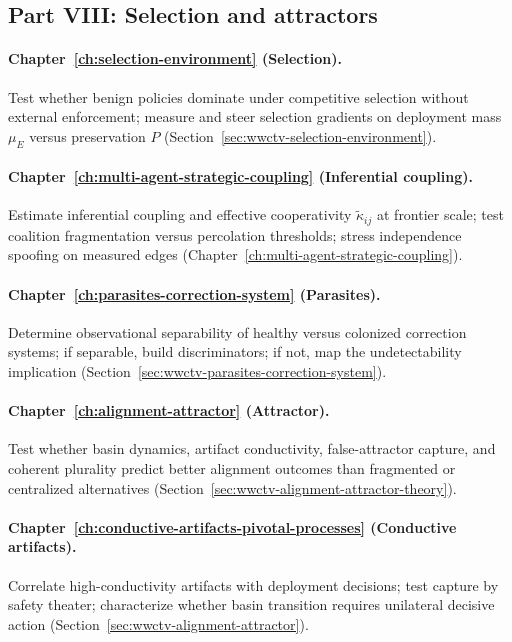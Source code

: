 \subsection{Part VIII: Selection and attractors}

\paragraph{Chapter~\ref{ch:selection-environment} (Selection).}
Test whether benign policies dominate under competitive selection without external enforcement; measure and steer selection gradients on deployment mass \(\mu_E\) versus preservation \(P\) (Section~\ref{sec:wwctv-selection-environment}).

\paragraph{Chapter~\ref{ch:multi-agent-strategic-coupling} (Inferential coupling).}
Estimate inferential coupling and effective cooperativity \(\tilde{\kappa}_{ij}\) at frontier scale; test coalition fragmentation versus percolation thresholds; stress independence spoofing on measured edges (Chapter~\ref{ch:multi-agent-strategic-coupling}).

\paragraph{Chapter~\ref{ch:parasites-correction-system} (Parasites).}
Determine observational separability of healthy versus colonized correction systems; if separable, build discriminators; if not, map the undetectability implication (Section~\ref{sec:wwctv-parasites-correction-system}).

\paragraph{Chapter~\ref{ch:alignment-attractor} (Attractor).}
Test whether basin dynamics, artifact conductivity, false-attractor capture, and coherent plurality predict better alignment outcomes than fragmented or centralized alternatives (Section~\ref{sec:wwctv-alignment-attractor-theory}).

\paragraph{Chapter~\ref{ch:conductive-artifacts-pivotal-processes} (Conductive artifacts).}
Correlate high-conductivity artifacts with deployment decisions; test capture by safety theater; characterize whether basin transition requires unilateral decisive action (Section~\ref{sec:wwctv-alignment-attractor}).


